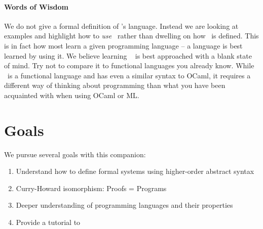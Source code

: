 \paragraph{Words of Wisdom}
We do not give a formal definition of \beluga's language.  Instead  we are looking at examples and highlight how to \emph{use} \beluga~rather than dwelling on how \beluga~is defined. This is in fact how most learn a given programming language -- a language is best learned by using it. We believe learning \beluga~ is best approached with a blank state of mind. Try not to compare it to functional languages you already know. While \beluga~is a functional language and has even a similar syntax to OCaml,  it requires a different way of thinking about programming than what you have been acquainted with when using OCaml or ML.



\section{Goals}
We pursue several goals with this companion:

\begin{enumerate}
\item Understand how to define formal systems using higher-order abstract syntax
\item Curry-Howard isomorphism: Proofs = Programs
\item Deeper understanding of programming languages and their properties
\item Provide a tutorial to \beluga
\end{enumerate}




